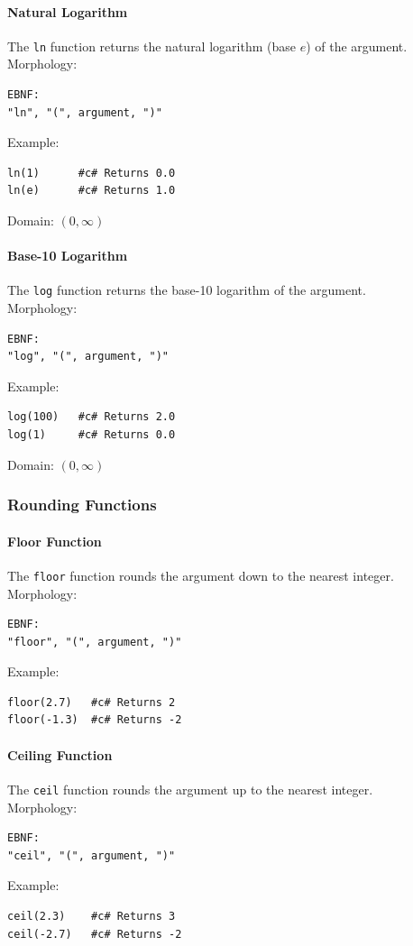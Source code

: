 \documentclass{report}
\begin{document}
\paragraph{Natural Logarithm}
The \texttt{ln} function returns the natural logarithm (base $e$) of the argument. \\
Morphology:
\begin{verbatim}
EBNF:
"ln", "(", argument, ")"
\end{verbatim}
Example:
\begin{verbatim}
ln(1)      #c# Returns 0.0
ln(e)      #c# Returns 1.0
\end{verbatim}
Domain: $(0, \infty)$

\paragraph{Base-10 Logarithm}
The \texttt{log} function returns the base-10 logarithm of the argument. \\
Morphology:
\begin{verbatim}
EBNF:
"log", "(", argument, ")"
\end{verbatim}
Example:
\begin{verbatim}
log(100)   #c# Returns 2.0
log(1)     #c# Returns 0.0
\end{verbatim}
Domain: $(0, \infty)$

\subsubsection{Rounding Functions}
\paragraph{Floor Function}
The \texttt{floor} function rounds the argument down to the nearest integer. \\
Morphology:
\begin{verbatim}
EBNF:
"floor", "(", argument, ")"
\end{verbatim}
Example:
\begin{verbatim}
floor(2.7)   #c# Returns 2
floor(-1.3)  #c# Returns -2
\end{verbatim}

\paragraph{Ceiling Function}
The \texttt{ceil} function rounds the argument up to the nearest integer. \\
Morphology:
\begin{verbatim}
EBNF:
"ceil", "(", argument, ")"
\end{verbatim}
Example:
\begin{verbatim}
ceil(2.3)    #c# Returns 3
ceil(-2.7)   #c# Returns -2
\end{verbatim}
\end{document}

